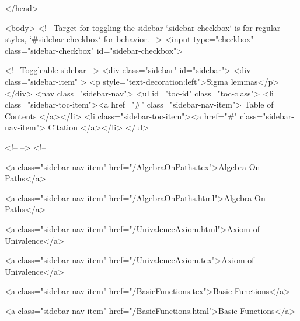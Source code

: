   
</head>




  <body>
    <!-- Target for toggling the sidebar `.sidebar-checkbox` is for regular
     styles, `#sidebar-checkbox` for behavior. -->
<input type="checkbox" class="sidebar-checkbox" id="sidebar-checkbox">

<!-- Toggleable sidebar -->
<div class="sidebar" id="sidebar">
  <div class="sidebar-item" >
    <p style="text-decoration:left">Sigma lemmas</p>
  </div>
  <nav class="sidebar-nav">
    <ul id="toc-id" class="toc-class">
  <li class="sidebar-toc-item"><a href="#" class="sidebar-nav-item"> Table of Contents </a></li>
  <li class="sidebar-toc-item"><a href="#" class="sidebar-nav-item"> Citation </a></li>
</ul>


    <!--  -->
    <!-- 
      
    
      
    
      
    
      
        
      
    
      
        
          <a class="sidebar-nav-item" href="/AlgebraOnPaths.tex">Algebra On Paths</a>
        
      
    
      
        
          <a class="sidebar-nav-item" href="/AlgebraOnPaths.html">Algebra On Paths</a>
        
      
    
      
        
          <a class="sidebar-nav-item" href="/UnivalenceAxiom.html">Axiom of Univalence</a>
        
      
    
      
        
          <a class="sidebar-nav-item" href="/UnivalenceAxiom.tex">Axiom of Univalence</a>
        
      
    
      
        
          <a class="sidebar-nav-item" href="/BasicFunctions.tex">Basic Functions</a>
        
      
    
      
        
          <a class="sidebar-nav-item" href="/BasicFunctions.html">Basic Functions</a>
        
      
    
      
        
